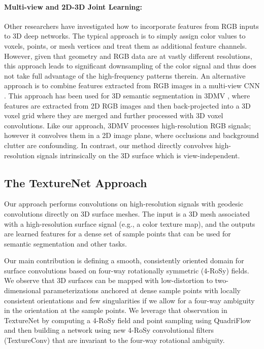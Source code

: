 \paragraph*{Multi-view and 2D-3D Joint Learning:}
Other researchers have investigated how to incorporate features from RGB inputs to 3D deep networks.  The typical approach is to simply assign color values to voxels, points, or mesh vertices and treat them as additional feature channels.
However, given that geometry and RGB data are at vastly different resolutions, this approach leads to significant downsampling of the color signal and thus does not take full advantage of the high-frequency patterns therein.   An alternative approach is to combine features extracted from RGB images in a multi-view CNN \cite{su2015multi}. This approach has been used for 3D semantic segmentation in 3DMV \cite{dai20183dmv}, where features are extracted from 2D RGB images and then back-projected into a 3D voxel grid where they are merged and further processed with 3D voxel convolutions.  Like our approach, 3DMV processes high-resolution RGB signals; however it convolves them in a 2D image plane, where occlusions and background clutter are confounding.  In contrast, our method directly convolves high-resolution signals intrinsically on the 3D surface which is view-independent.


\subsection{The TextureNet Approach}
Our approach performs convolutions on high-resolution signals with geodesic convolutions directly on 3D surface meshes.
The input is a 3D mesh associated with a high-resolution surface signal (e.g., a color texture map), and the outputs are learned features for a dense set of sample points that can be used for semantic segmentation and other tasks.   

Our main contribution is defining a smooth, consistently oriented domain for surface convolutions based on four-way rotationally symmetric (4-RoSy) fields.   We observe that 3D surfaces can be mapped with low-distortion to two-dimensional parameterizations anchored at dense sample points with locally consistent orientations and few singularities if we allow for a four-way ambiguity in the orientation at the sample points.   We leverage that observation in TextureNet by computing a 4-RoSy field and point sampling using QuadriFlow~\cite{huang2018quadriflow} and then building a network using new 4-RoSy convolutional filters (TextureConv) that are invariant to the four-way rotational ambiguity.   

